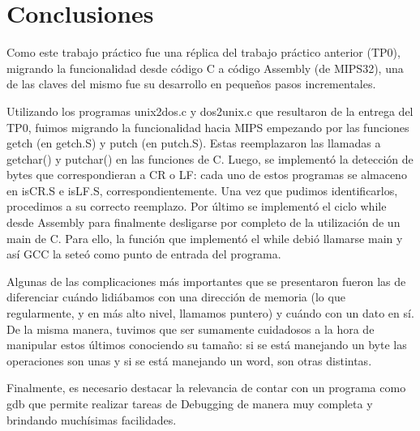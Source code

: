 \documentclass[a4paper,11pt]{article}
\begin{document}
\section{Conclusiones}

Como este trabajo práctico fue una réplica del trabajo práctico anterior (TP0), migrando la funcionalidad desde código C a código Assembly (de MIPS32), una de las claves del mismo fue su desarrollo en pequeños pasos incrementales.

\indent
Utilizando los programas unix2dos.c y dos2unix.c que resultaron de la entrega del TP0, fuimos migrando la funcionalidad hacia MIPS empezando por las funciones getch (en getch.S) y putch (en putch.S). Estas reemplazaron las llamadas a getchar() y putchar() en las funciones de C. Luego, se implementó la detección de bytes que correspondieran a CR o LF: cada uno de estos programas se almaceno en isCR.S e isLF.S, correspondientemente. Una vez que pudimos identificarlos, procedimos a su correcto reemplazo.
Por último se implementó el ciclo while desde Assembly para finalmente desligarse por completo de la utilización de un main de C. Para ello, la función que implementó el while debió llamarse main y así GCC la seteó como punto de entrada del programa.

\indent
Algunas de las complicaciones más importantes que se presentaron fueron las de diferenciar cuándo lidiábamos con una dirección de memoria (lo que regularmente, y en más alto nivel, llamamos puntero) y cuándo con un dato en sí. De la misma manera, tuvimos que ser sumamente cuidadosos a la hora de manipular estos últimos conociendo su tamaño: si se está manejando un byte las operaciones son unas y si se está manejando un word, son otras distintas.

\indent
Finalmente, es necesario destacar la relevancia de contar con un programa como gdb que permite realizar tareas de Debugging de manera muy completa y brindando muchísimas facilidades.
\end{document}
